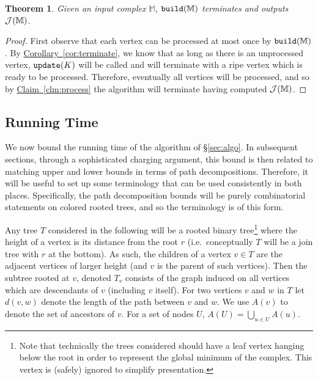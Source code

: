 \documentclass[11pt]{article}
\newtheorem{theorem}{Theorem}[section]
\theoremstyle{definition}
\newcommand{\cJ}{{\cal J}}
\newcommand{\MM}{\mathbb{M}}
\newcommand{\Sec}[1]{\hyperref[sec:#1]{\S\ref*{sec:#1}}} %
\newcommand{\Clm}[1]{\hyperref[clm:#1]{Claim~\ref*{clm:#1}}} %
\newcommand{\Cor}[1]{\hyperref[cor:#1]{Corollary~\ref*{cor:#1}}} %
\newcommand{\build}{{\tt build}}
\newcommand{\update}{{\tt update}}
\begin{document}
\begin{theorem}
\label{thm:correct}
 Given an input complex $\MM$, $\build(\MM)$ terminates and outputs $\cJ(\MM)$.
\end{theorem}
\begin{proof}
 First observe that each vertex can be processed at most once by $\build(\MM)$.  By \Cor{terminate}, we know that as long as there 
 is an unprocessed vertex, $\update(K)$ will be called and will terminate with a ripe vertex which is ready to be processed. 
 Therefore, eventually all vertices will be processed, and so by \Clm{process} the algorithm will terminate having 
 computed $\cJ(\MM)$.
\end{proof}




\subsection{Running Time}
\label{sec:runTime}

We now bound the running time of the algorithm of \Sec{algo}.  
In subsequent sections, through a sophisticated charging argument, this bound is then related to matching upper 
and lower bounds in terms of path decompositions. 
Therefore, it will be useful to set up some terminology that can 
be used consistently in both places.  Specifically, the path decomposition bounds will be purely combinatorial 
statements on colored rooted trees, and so the terminology is of this form.

Any tree $T$ considered in the following will be a rooted binary tree\footnote{Note 
that technically the trees considered should have a leaf vertex hanging below the root  
in order to represent the global minimum of the complex.  This vertex is 
(safely) ignored to simplify presentation.} where the height of a vertex is its distance 
from the root $r$ (i.e.\ conceptually $T$ will be a join tree with $r$ at the bottom).  
As such, the children of a vertex $v\in T$ are the adjacent vertices of larger height
(and $v$ is the parent of such vertices).  Then the subtree rooted at $v$, denoted $T_v$ consists of the graph induced on all 
vertices which are descendants of $v$ (including $v$ itself).  For two vertices $v$ and $w$ in $T$ let $d(v,w)$ denote the 
length of the path between $v$ and $w$.
We use $A(v)$ to denote the set of ancestors of $v$.
For a set of nodes $U$, $A(U) = \bigcup_{u \in U} A(u)$.
\end{document}
